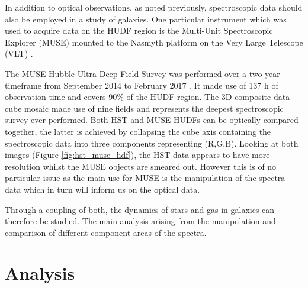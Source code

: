 \documentclass[12pt, twocolumn]{revtex4-1}    %
\begin{document}
In addition to optical observations, as noted previously, spectroscopic data should also be employed in a study of galaxies. One particular instrument which was used to acquire data on the HUDF region is the Multi-Unit Spectroscopic Explorer (MUSE) mounted to the Nasmyth platform on the Very Large Telescope (VLT) \citep{bacon_muse_proposal}. 


The MUSE Hubble Ultra Deep Field Survey was performed over a two year timeframe from September 2014 to February 2017 \citep{bacon_muse_hudf}. It made use of 137 h of observation time and covers 90\% of the HUDF region. The 3D composite data cube mosaic made use of nine fields and represents the deepest spectroscopic survey ever performed. Both HST and MUSE HUDFs can be optically compared together, the latter is achieved by collapsing the cube axis containing the spectroscopic data into three components representing (R,G,B). Looking at both images (Figure \ref{fig:hst_muse_hdf}), the HST data appears to have more resolution whilst the MUSE objects are smeared out. However this is of no particular issue as the main use for MUSE is the manipulation of the spectra data which in turn will inform us on the optical data.




Through a coupling of both, the dynamics of stars and gas in galaxies can therefore be studied. The main analysis arising from the manipulation and comparison of different component areas of the spectra.




\section*{Analysis} 
\label{sec:analysis}
\end{document}
